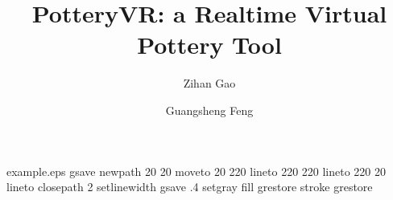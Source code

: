 %
%
%
%
%
\begin{filecontents*}{example.eps}
gsave
newpath
  20 20 moveto
  20 220 lineto
  220 220 lineto
  220 20 lineto
closepath
2 setlinewidth
gsave
  .4 setgray fill
grestore
stroke
grestore
\end{filecontents*}
%
\RequirePackage{fix-cm}
%
\documentclass[smallextended]{svjour3}       %
%
\smartqed  %
%
\usepackage{graphicx}
%
%
%
%
%


\title{PotteryVR: a Realtime Virtual Pottery Tool%
}


\author{Zihan Gao         \and
        Guangsheng Feng %
}


